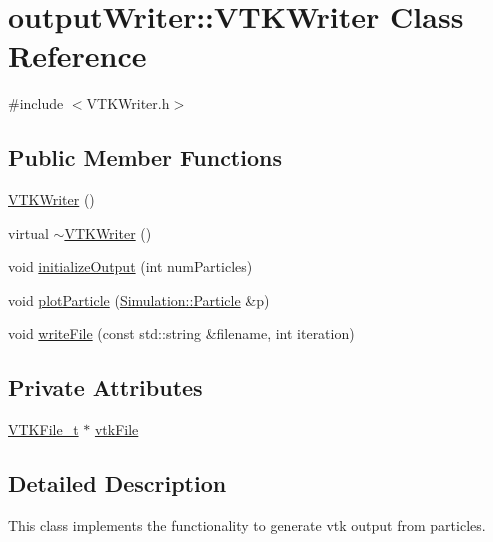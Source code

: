 \hypertarget{classoutputWriter_1_1VTKWriter}{\section{output\-Writer\-:\-:V\-T\-K\-Writer Class Reference}
\label{classoutputWriter_1_1VTKWriter}
}


{\ttfamily \#include $<$V\-T\-K\-Writer.\-h$>$}

\subsection*{Public Member Functions}
\begin{DoxyCompactItemize}
\item 
\hyperlink{classoutputWriter_1_1VTKWriter_a448311c322544e40c6e0a3c158924583}{V\-T\-K\-Writer} ()
\item 
virtual \hyperlink{classoutputWriter_1_1VTKWriter_a196a54bcfa3f93638ef292c386f91b61}{$\sim$\-V\-T\-K\-Writer} ()
\item 
void \hyperlink{classoutputWriter_1_1VTKWriter_a41cfcefce4d7eb434f1dd45f5aeb3e8f}{initialize\-Output} (int num\-Particles)
\item 
void \hyperlink{classoutputWriter_1_1VTKWriter_a1e3f26c7e11379ab3352f5495bfd41b5}{plot\-Particle} (\hyperlink{classSimulation_1_1Particle}{Simulation\-::\-Particle} \&p)
\item 
void \hyperlink{classoutputWriter_1_1VTKWriter_ad0d7afb78a2027d05e9a03acde3799dd}{write\-File} (const std\-::string \&filename, int iteration)
\end{DoxyCompactItemize}
\subsection*{Private Attributes}
\begin{DoxyCompactItemize}
\item 
\hyperlink{classVTKFile__t}{V\-T\-K\-File\-\_\-t} $\ast$ \hyperlink{classoutputWriter_1_1VTKWriter_ab654ea4308b92e5dbdcd9a6833d5ed30}{vtk\-File}
\end{DoxyCompactItemize}


\subsection{Detailed Description}
This class implements the functionality to generate vtk output from particles. 

